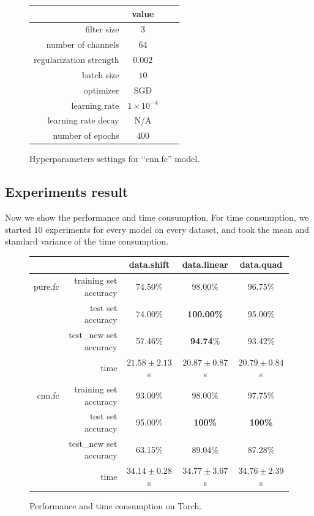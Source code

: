 \documentclass[a4paper]{article}
\begin{document}
\begin{figure}[H]
\centering
\begin{tabular}{|r|c|c|c|}
\hline
 & value \\
\hline
filter size & $3$ \\
\hline
number of channels & $64$ \\
\hline
regularization strength & $0.002$ \\
\hline
batch size & $10$ \\
\hline
optimizer & SGD \\
\hline
learning rate & $1\times10^{-4}$\\
\hline
learning rate decay & N/A \\
\hline
number of epochs & $400$ \\
\hline
\end{tabular}
\caption{Hyperparameters settings for ``cnn.fc'' model.}
\end{figure}

\subsection{Experiments result}

Now we show the performance and time consumption. For time consumption, we started $10$ experiments for every model on every dataset, and took the mean and standard variance of the time consumption.

\begin{figure}[H]
\centering
\begin{tabular}{|r|r|c|c|c|}
\hline
 & & data.shift & data.linear & data.quad \\
\hline
pure.fc & training set accuracy & 74.50\% & 98.00\% & 96.75\% \\
 & test set accuracy & 74.00\% & \textbf{100.00\%} & 95.00\% \\
 & test\_new set accuracy & 57.46\% & \textbf{94.74}\% & 93.42\%\\
 & time & $21.58 \pm 2.13$ s & $20.87 \pm 0.87$ s & $20.79 \pm 0.84$ s\\
\hline
cnn.fc & training set accuracy & 93.00\% & 98.00\% &97.75\%\\
 & test set accuracy & 95.00\% &\textbf{100\%} &\textbf{100\%}\\
 & test\_new set accuracy & 63.15\% & 89.04\% &87.28\%\\
 & time & $34.14 \pm 0.28$s & $34.77 \pm 3.67$s & $34.76 \pm 2.39$s\\
\hline
\end{tabular}
\caption{Performance and time consumption on Torch.}
\end{figure}
\end{document}
